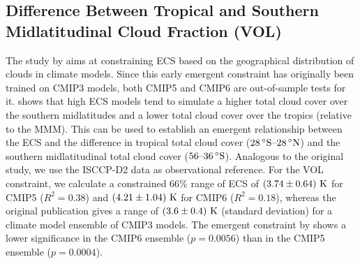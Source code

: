 \subsection{Difference Between Tropical and Southern Midlatitudinal Cloud
  Fraction (VOL)}
\label{subsec:05:vol}

The study by \textcite{Volodin2008} aims at constraining \ac{ECS} based on the
geographical distribution of clouds in climate models. Since this early
emergent constraint has originally been trained on \acs{CMIP}3 models, both
\acs{CMIP}5 and \acs{CMIP}6 are out-of-sample tests for it.
\textcite{Volodin2008} shows that high \ac{ECS} models tend to simulate a
higher total cloud cover over the southern midlatitudes and a lower total cloud
cover over the tropics (relative to the \ac{MMM}). This can be used to
establish an emergent relationship between the \ac{ECS} and the difference in
tropical total cloud cover ($\range{28 \unit{\degree S}}{28 \unit{\degree N}}$)
and the southern midlatitudinal total cloud cover ($\rangeunit{56}{36}{\degree
  S}$). Analogous to the original study, we use the ISCCP-D2 data
\autocite{Rossow1991} as observational reference. For the VOL constraint, we
calculate a constrained $66 \unit{\%}$ range of \ac{ECS} of
$\pmrangeunit{3.74}{0.64}{K}$ for \acs{CMIP}5 ($R^2 = 0.38$) and
$\pmrangeunit{4.21}{1.04}{K}$ for \acs{CMIP}6 ($R^2 = 0.18$), whereas the
original publication gives a range of $\pmrangeunit{3.6}{0.4}{K}$ (standard
deviation) for a climate model ensemble of \acs{CMIP}3 models. The emergent
constraint by \textcite{Volodin2008} shows a lower significance in the
\acs{CMIP}6 ensemble ($p = 0.0056$) than in the \acs{CMIP}5 ensemble ($p =
0.0004$).

